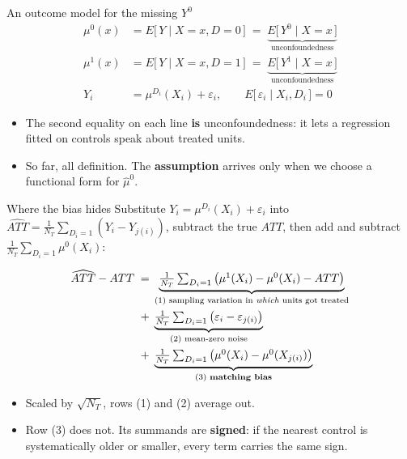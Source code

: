 \documentclass[
  11pt,
  ignorenonframetext,
  aspectratio=169,
]{beamer}
\providecommand{\tightlist}{%
  \setlength{\itemsep}{0pt}\setlength{\parskip}{0pt}}
\begin{document}
\begin{frame}{An outcome model for the missing \(Y^0\)}
\protect{}\label{an-outcome-model-for-the-missing-y0}
\[
\begin{aligned}
\mu^0(x) &= E\big[\,Y \mid X{=}x, D{=}0\,\big] \;=\; \underbrace{E\big[\,Y^0 \mid X{=}x\,\big]}_{\text{unconfoundedness}} \\
\mu^1(x) &= E\big[\,Y \mid X{=}x, D{=}1\,\big] \;=\; \underbrace{E\big[\,Y^1 \mid X{=}x\,\big]}_{\text{unconfoundedness}} \\[0.3em]
Y_i &= \mu^{D_i}(X_i) + \varepsilon_i, \qquad E\big[\,\varepsilon_i \mid X_i, D_i\,\big] = 0
\end{aligned}
\]

\begin{itemize}
\tightlist
\item
  The second equality on each line \textbf{is} unconfoundedness: it lets
  a regression fitted on controls speak about treated units.
\item
  So far, all definition. The \textbf{assumption} arrives only when we
  choose a functional form for \(\hat\mu^0\).
\end{itemize}
\end{frame}

\begin{frame}{Where the bias hides}
\protect{}\label{where-the-bias-hides}
Substitute \(Y_i = \mu^{D_i}(X_i)+\varepsilon_i\) into
\(\widehat{ATT}=\frac{1}{N_T}\sum_{D_i=1}(Y_i - Y_{j(i)})\), subtract
the true \(ATT\), then add and subtract
\(\frac{1}{N_T}\sum_{D_i=1}\mu^0(X_i)\):

\[
\begin{aligned}
\widehat{ATT} - ATT \;=\;& \underbrace{\tfrac{1}{N_T}\textstyle\sum_{D_i=1}\big(\mu^1(X_i) - \mu^0(X_i) - ATT\big)}_{\text{(1) sampling variation in \emph{which} units got treated}} \\
+\;& \underbrace{\tfrac{1}{N_T}\textstyle\sum_{D_i=1}\big(\varepsilon_i - \varepsilon_{j(i)}\big)}_{\text{(2) mean-zero noise}} \\
+\;& \underbrace{\tfrac{1}{N_T}\textstyle\sum_{D_i=1}\big(\mu^0(X_i) - \mu^0(X_{j(i)})\big)}_{\text{(3) \textbf{matching bias}}}
\end{aligned}
\]

\begin{itemize}
\tightlist
\item
  Scaled by \(\sqrt{N_T}\), rows (1) and (2) average out.
\item
  Row (3) does not. Its summands are \textbf{signed}: if the nearest
  control is systematically older or smaller, every term carries the
  same sign.
\end{itemize}
\end{frame}
\end{document}
